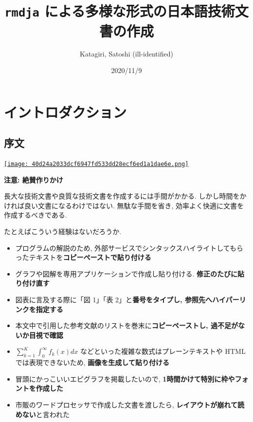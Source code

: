 \documentclass[
]{bxjsbook}
\title{\texttt{rmdja} による多様な形式の日本語技術文書の作成}
\author{Katagiri, Satoshi (ill-identified)}
\date{2020/11/9}
\providecommand{\tightlist}{%
  \setlength{\itemsep}{0pt}\setlength{\parskip}{0pt}}
\theoremstyle{definition}
\theoremstyle{definition}
\theoremstyle{definition}
\theoremstyle{remark}
\begin{document}
\maketitle

{
\hypersetup{linkcolor=}
\setcounter{tocdepth}{2}
\tableofcontents
}
\hypertarget{part-ux30a4ux30f3ux30c8ux30edux30c0ux30afux30b7ux30e7ux30f3}{%
\part{
イントロダクション}\label{part-ux30a4ux30f3ux30c8ux30edux30c0ux30afux30b7ux30e7ux30f3}}

\hypertarget{ux5e8fux6587}{%
\chapter*{序文}\label{ux5e8fux6587}}

\href{https://creativecommons.org/licenses/by-nc/4.0/deed.ja}{\texttt{[image: 40d24a2033dcf6947fd533dd28ecf6ed1a1dae6e.png]}}

\textbf{注意: 絶賛作りかけ}

長大な技術文書や良質な技術文書を作成するには手間がかかる.
しかし時間をかければ良い文書になるわけではない. 無駄な手間を省き,
効率よく快適に文書を作成するべきである.

たとえばこういう経験はないだろうか.

\begin{itemize}
\tightlist
\item
  プログラムの解説のため,
  外部サービスでシンタックスハイライトしてもらったテキストを\textbf{コピーペーストで貼り付ける}
\item
  グラフや図解を専用アプリケーションで作成し貼り付ける.
  \textbf{修正のたびに貼り付け直す}
\item
  図表に言及する際に「図 1」「表 2」と\textbf{番号をタイプし,
  参照先へハイパーリンクを指定する}
\item
  本文中で引用した参考文献のリストを巻末に\textbf{コピーペーストし,
  過不足がないか目視で確認}
\item
  \(\sum_{k=1}^K\int_0^\infty f_k(x) dx\)
  などといった複雑な数式はプレーンテキストや HTML では表現できないため,
  \textbf{画像を生成して貼り付ける}
\item
  冒頭にかっこいいエピグラフを掲載したいので,
  \textbf{1時間かけて特別に枠やフォントを作成した}
\item
  市販のワードプロセッサで作成した文書を渡したら,
  \textbf{レイアウトが崩れて読めない}と言われた
\end{itemize}
\end{document}
